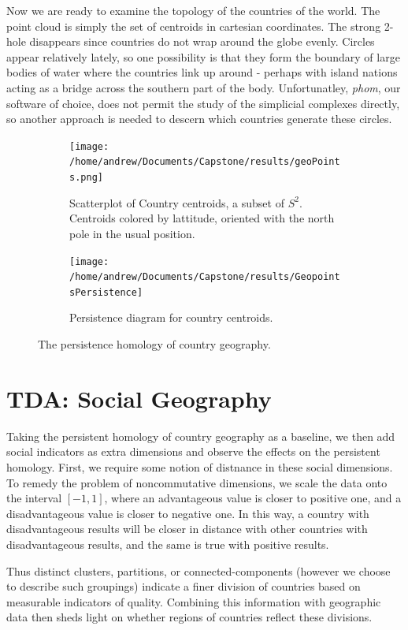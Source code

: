 \documentclass[11pt]{amsart}
\theoremstyle{remark}	  \newtheorem*{remark}{Remark}
\numberwithin{equation}{section}
\begin{document}
Now we are ready to examine the topology of the countries of the world. The point cloud is simply the set of centroids in cartesian coordinates. The strong 2-hole disappears since countries do not wrap around the globe evenly. Circles appear relatively lately, so one possibility is that they form the boundary of large bodies of water where the countries link up around - perhaps with island nations acting as a bridge across the southern part of the body. Unfortunatley, \emph{phom}, our software of choice,  does not permit the study of the simplicial complexes directly, so another approach is needed to descern which countries generate these circles. 

\begin{figure}
\centering
\begin{subfigure}{.5\textwidth}
  \centering
  \texttt{[image: /home/andrew/Documents/Capstone/results/geoPoints.png]}
  \caption{Scatterplot of Country centroids, a subset of $S^2$.  Centroids colored by lattitude, oriented with the north pole in the usual position.}
  \label{fig:sub1}
\end{subfigure}%
\begin{subfigure}{.5\textwidth}
  \centering
  \texttt{[image: /home/andrew/Documents/Capstone/results/GeopointsPersistence]}
  \caption{Persistence diagram for country centroids.}
  \label{fig:sub2}
\end{subfigure}
\caption{The persistence homology of country geography.}
\label{fig:geography}
\end{figure}

\section{TDA: Social Geography}

Taking the persistent homology of country geography as a baseline, we then add social indicators as extra dimensions and observe the effects on the persistent homology. First, we  require some notion of distnance in these social dimensions. To remedy the problem of noncommutative dimensions, we scale the data onto the interval $[-1,1]$, where an advantageous value is closer to positive one, and a disadvantageous value is closer to negative one. In this way, a country with disadvantageous results will be closer in distance with other countries with disadvantageous results, and the same is true with positive results. 

Thus  distinct clusters, partitions, or connected-components (however we choose to describe such groupings) indicate a finer division of countries based on measurable indicators of quality. Combining this information with geographic data then sheds light on whether regions of countries reflect these divisions. 
\end{document}
